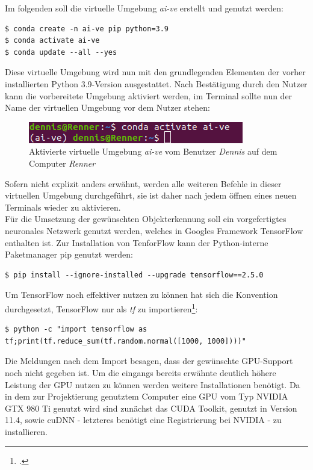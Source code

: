 \documentclass[12pt, oneside]{article}
\begin{document}
Im folgenden soll die virtuelle Umgebung \textit{ai-ve} erstellt und genutzt werden:

\begin{verbatim}
$ conda create -n ai-ve pip python=3.9
$ conda activate ai-ve
$ conda update --all --yes
\end{verbatim}
Diese virtuelle Umgebung wird nun mit den grundlegenden Elementen der vorher installierten Python 3.9-Version ausgestattet. Nach Bestätigung durch den Nutzer kann die vorbereitete Umgebung aktiviert werden, im Terminal sollte nun der Name der virtuellen Umgebung vor dem Nutzer stehen:

\begin{figure}[htbp]
	\centering
	\includegraphics[scale=0.75]{Bilder/misc/aktive venv.png}
	\caption{Aktivierte virtuelle Umgebung \textit{ai-ve} vom Benutzer \textit{Dennis} auf dem Computer \textit{Renner}}
	\label{fig:aktive venv}
\end{figure}
Sofern nicht explizit anders erwähnt, werden alle weiteren Befehle in dieser virtuellen Umgebung durchgeführt, sie ist daher nach jedem öffnen eines neuen Terminals wieder zu aktivieren.\\

Für die Umsetzung der gewünschten Objekterkennung soll ein vorgefertigtes neuronales Netzwerk genutzt werden, welches in Googles Framework TensorFlow enthalten ist. Zur Installation von TenforFlow kann der Python-interne Paketmanager pip genutzt werden:

\begin{verbatim}
$ pip install --ignore-installed --upgrade tensorflow==2.5.0
\end{verbatim}
Um TensorFlow noch effektiver nutzen zu können hat sich die Konvention durchgesetzt, TensorFlow nur als \textit{tf} zu importieren\footcite{verify_tf_installation}:

\begin{verbatim}
$ python -c "import tensorflow as tf;print(tf.reduce_sum(tf.random.normal([1000, 1000])))"
\end{verbatim}
Die Meldungen nach dem Import besagen, dass der gewünschte GPU-Support noch nicht gegeben ist. Um die eingangs bereits erwähnte deutlich höhere Leistung der GPU nutzen zu können werden weitere Installationen benötigt. Da in dem zur Projektierung genutztem Computer eine GPU vom Typ NVIDIA GTX 980 Ti genutzt wird sind zunächst das CUDA Toolkit, genutzt in Version 11.4, sowie cuDNN - letzteres benötigt eine Registrierung bei NVIDIA - zu installieren.
\end{document}
